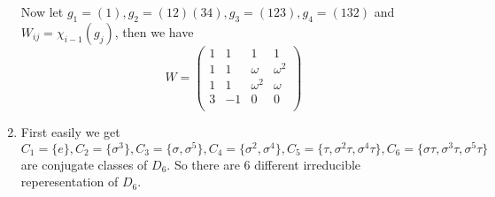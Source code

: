 \documentclass{ctexart}
\begin{document}
\begin{solution}
\begin{enumerate}
		      Now let \(g_1 = ( 1),g_2 = ( 12)( 34),g_3 = ( 123),g_4=( 132) \) and \(W_{ij}=\chi_{i-1}( g_j)\), then we have
		      \[
			      W=\begin{pmatrix}
				      1 & 1  & 1        & 1        \\
				      1 & 1  & \omega   & \omega^2 \\
				      1 & 1  & \omega^2 & \omega   \\
				      3 & -1 & 0        & 0        \\
			      \end{pmatrix}
		      \]
		\item
		      First easily we get \(C_1=\{ e\},C_2=\{ \sigma^3\},C_3=\{ \sigma,\sigma^5\},C_4=\{ \sigma^2,\sigma^4\},C_5=\{ \tau,\sigma^2 \tau,\sigma^4 \tau\},C_6=\{ \sigma \tau,\sigma^3 \tau,\sigma^5 \tau\}\) are conjugate classes of \(D_6\).
		      So there are \(6\) different irreducible reperesentation of \(D_6\).
	\end{enumerate}
\end{solution}
\end{document}
